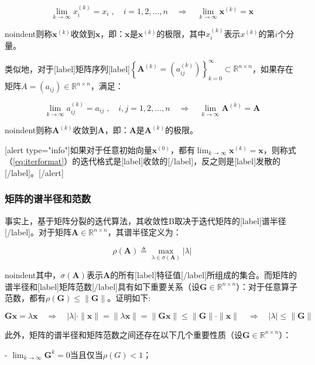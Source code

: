\documentclass[12pt, UTF8, nofonts]{ctexart}
\begin{document}
\[
    \lim_{k\to\infty}x_i^{(k)}=x_i \;,\quad i=1,2,\ldots,n \quad \Rightarrow \quad \lim_{k\to\infty}\boldsymbol{x}^{(k)}=\boldsymbol{x}
\]

noindent则称$\boldsymbol{x}^{(k)}$收敛到$\boldsymbol{x}$，即：$\boldsymbol{x}$是$\boldsymbol{x}^{(k)}$的极限，其中$x_i^{(k)}$表示$x^{(k)}$的第$i$个分量。

类似地，对于[label]矩阵序列[label]$\left\{\boldsymbol{A}^{(k)}=\left(a_{ij}^{(k)}\right)\right\}_{k=0}^{\infty}\subset\mathbb{R}^{n \times n}$，如果存在矩阵$A=\left(a_{ij}\right)\in\mathbb{R}^{n \times n}$，满足：

\[
    \lim_{k\to\infty}a_{ij}^{(k)}=a_{ij} \;,\quad i,j=1,2,\ldots,n \quad \Rightarrow \quad \lim_{k\to\infty}\boldsymbol{A}^{(k)} = \boldsymbol{A}
\]

noindent则称$\boldsymbol{A}^{(k)}$收敛到$\boldsymbol{A}$，即：$\boldsymbol{A}$是$\boldsymbol{A}^{(k)}$的极限。

[alert type="info"]如果对于任意初始向量$\boldsymbol{x}^{(0)}$，都有$\lim_{k\to\infty}\boldsymbol{x}^{(k)}=\boldsymbol{x}$，则称式（\ref{eq:iterformat}）的迭代格式是[label]收敛的[/label]，反之则是[label]发散的[/label]。[/alert]

\subsubsection*{矩阵的谱半径和范数}

事实上，基于矩阵分裂的迭代算法，其收敛性B取决于迭代矩阵的[label]谱半径[/label]。对于矩阵$\boldsymbol{A}\in\mathbb{R}^{n \times n}$，其谱半径定义为：

\[
    \rho(\boldsymbol{A}) \triangleq \max_{\lambda\in\sigma(\boldsymbol{A})}|\lambda|
\]

noindent其中，$\sigma(\boldsymbol{A})$表示$\boldsymbol{A}$的所有[label]特征值[/label]所组成的集合。而矩阵的谱半径和[label]矩阵范数[/label]具有如下重要关系（设$\boldsymbol{G}\in\mathbb{R}^{n \times n}$）：对于任意算子范数，都有$\rho(\boldsymbol{G})\leq\|\boldsymbol{G}\|$。证明如下:

\[
    \boldsymbol{Gx}=\lambda\boldsymbol{x} \quad \Rightarrow \quad
    |\lambda|\cdot\|\boldsymbol{x}\| = \|\lambda\boldsymbol{x}\| = \|\boldsymbol{Gx}\| \leq \|\boldsymbol{G}\| \cdot \|\boldsymbol{x}\|
    \quad \Rightarrow \quad |\lambda| \leq \|\boldsymbol{G}\|
\]

此外，矩阵的谱半径和矩阵范数之间还存在以下几个重要性质（设$\boldsymbol{G}\in\mathbb{R}^{n \times n}$）：

- $\lim_{k\to\infty}\boldsymbol{G}^{k}=0$当且仅当$\rho(G)<1$；
\end{document}
